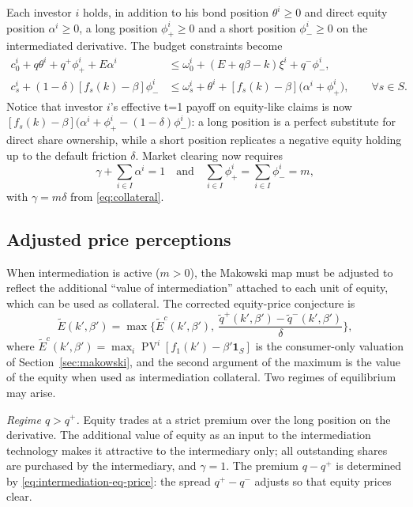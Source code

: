 \documentclass[11pt,a4paper,oneside]{book}
\def\1{\mathbf{1}}
\def\leq{\leqslant}
\def\geq{\geqslant}
\def\et{\quad \text{and} \quad}
\DeclareMathOperator{\PV}{PV}
\theoremstyle{plain}
\theoremstyle{definition}
\theoremstyle{remark}
\numberwithin{equation}{chapter}
\begin{document}
Each investor $i$ holds, in addition to his bond position $\theta^i \geq 0$ and direct equity position $\alpha^i \geq 0$, a long position $\phi^i_+ \geq 0$ and a short position $\phi^i_- \geq 0$ on the intermediated derivative.
The budget constraints become
\begin{align}
  c^i_0 + q \theta^i + q^+ \phi^i_+ + E \alpha^i
  &\leq
  \omega^i_0 + (E + q \beta - k) \xi^i + q^- \phi^i_-,
  \label{eq:budget-0-int}\\[2pt]
  c^i_s + (1 - \delta) [f_s(k) - \beta] \phi^i_-
  &\leq
  \omega^i_s + \theta^i + [f_s(k) - \beta] \bigl( \alpha^i + \phi^i_+ \bigr),
  \qquad \forall s \in S.
  \label{eq:budget-s-int}
\end{align}
Notice that investor $i$'s effective t=1 payoff on equity-like claims is now $[f_s(k) - \beta] \bigl( \alpha^i + \phi^i_+ - (1-\delta) \phi^i_- \bigr)$: a long position is a perfect substitute for direct share ownership, while a short position replicates a negative equity holding up to the default friction $\delta$.
Market clearing now requires
\begin{equation*}
  \gamma + \sum_{i \in I} \alpha^i = 1
  \et
  \sum_{i \in I} \phi^i_+ = \sum_{i \in I} \phi^i_- = m,
\end{equation*}
with $\gamma = m \delta$ from \eqref{eq:collateral}.

\subsection{Adjusted price perceptions}

When intermediation is active ($m > 0$), the Makowski map must be adjusted to reflect the additional ``value of intermediation'' attached to each unit of equity, which can be used as collateral.
The corrected equity-price conjecture is
\begin{equation}\label{eq:makowski-intermediation}
  \widetilde{E}(k', \beta')
  =
  \max \Biggl\{
  \widetilde{E}^c(k', \beta'),
  \ \frac{\widetilde{q}^+(k', \beta') - \widetilde{q}^-(k', \beta')}{\delta}
  \Biggr\},
\end{equation}
where $\widetilde{E}^c(k', \beta') = \max_i \PV^i[f_1(k') - \beta' \1_S]$ is the consumer-only valuation of Section~\ref{sec:makowski}, and the second argument of the maximum is the value of the equity when used as intermediation collateral.
Two regimes of equilibrium may arise.

\emph{Regime $q > q^+$.}
Equity trades at a strict premium over the long position on the derivative.
The additional value of equity as an input to the intermediation technology makes it attractive to the intermediary only; all outstanding shares are purchased by the intermediary, and $\gamma = 1$.
The premium $q - q^+$ is determined by \eqref{eq:intermediation-eq-price}: the spread $q^+ - q^-$ adjusts so that equity prices clear.
\end{document}
